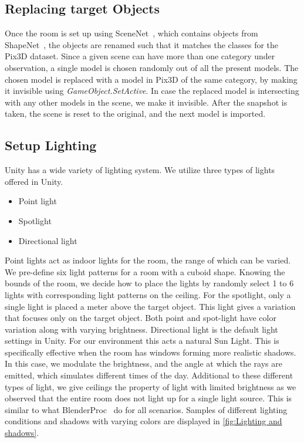 \subsection{Replacing target Objects}\label{subsec:implementation_replacing-target-objects}
Once the room is set up using SceneNet~\cite{McCormac:etal:ICCV2017}, which contains objects from ShapeNet~\cite{chang2015shapenet}, the objects are renamed such that it matches the classes for the Pix3D dataset.
Since a given scene can have more than one category under observation, a single model is chosen randomly out of all the present models.
The chosen model is replaced with a model in Pix3D of the same category, by making it invisible using \emph{GameObject.SetActive}.
In case the replaced model is intersecting with any other models in the scene, we make it invisible.
After the snapshot is taken, the scene is reset to the original, and the next model is imported.


\subsection{Setup Lighting}\label{subsec:implementation_lighting}

Unity has a wide variety of lighting system.
We utilize three types of lights offered in Unity.

\begin{itemize}
    \item Point light
    \item Spotlight
    \item Directional light
\end{itemize}

Point lights act as indoor lights for the room, the range of which can be varied.
We pre-define six light patterns for a room with a cuboid shape.
Knowing the bounds of the room, we decide how to place the lights by randomly select 1 to 6 lights with corresponding light patterns on the ceiling.
For the spotlight, only a single light is placed a meter above the target object.
This light gives a variation that focuses only on the target object.
Both point and spot-light have color variation along with varying brightness.
Directional light is the default light settings in Unity.
For our environment this acts a natural Sun Light.
This is specifically effective when the room has windows forming more realistic shadows.
In this case, we modulate the brightness, and the angle at which the rays are emitted, which simulates different times of the day.
Additional to these different types of light, we give ceilings the property of light with limited brightness as we observed that the entire room does not light up for a single light source.
This is similar to what BlenderProc~\cite{denninger2019blenderproc} do for all scenarios.
Samples of different lighting conditions and shadows with varying colors are displayed in \autoref{fig:Lighting and shadows}.


